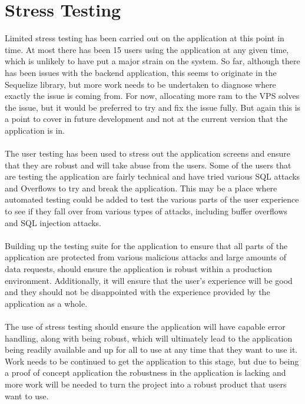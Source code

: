 \section{Stress Testing}

Limited stress testing has been carried out on the application at this point in time. At most there has been 15 users using the application at any given time, which is unlikely to have put a major strain on the system. So far, although there has been issues with the backend application, this seems to originate in the Sequelize library, but more work needs to be undertaken to diagnose where exactly the issue is coming from. For now, allocating more ram to the VPS solves the issue, but it would be preferred to try and fix the issue fully. But again this is a point to cover in future development and not at the current version that the application is in.\\
\\
The user testing has been used to stress out the application screens and ensure that they are robust and will take abuse from the users. Some of the users that are testing the application are fairly technical and have tried various SQL attacks and Overflows to try and break the application. This may be a place where automated testing could be added to test the various parts of the user experience to see if they fall over from various types of attacks, including buffer overflows and SQL injection attacks.\\
\\
Building up the testing suite for the application to ensure that all parts of the application are protected from various malicious attacks and large amounts of data requests, should ensure the application is robust within a production environment. Additionally, it will ensure that the user's experience will be good and they should not be disappointed with the experience provided by the application as a whole.\\
\\
The use of stress testing should ensure the application will have capable error handling, along with being robust, which will ultimately lead to the application being readily available and up for all to use at any time that they want to use it. Work needs to be continued to get the application to this stage, but due to being a proof of concept application the robustness in the application is lacking and more work will be needed to turn the project into a robust product that users want to use.
